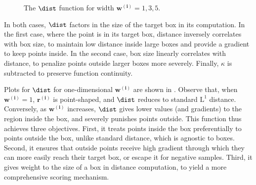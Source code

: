 \documentclass{article}
\begin{document}
\begin{wrapfigure}[16]{r}{0.35\textwidth}
\centering
{}
\caption{The $\dist$ function for width ${\bm{w^{(i)}}=1,3,5}$.}
\label{fig:boxdist}
\end{wrapfigure}

In both cases, $\dist$ factors in the size of the target box in its computation. In the first case, where the point is in its target box, distance inversely correlates with box size, to maintain low distance inside large boxes and provide a gradient to keep points inside. In the second case, box size linearly correlates with distance, to penalize points outside larger boxes more severely. Finally, $\kappa$ is subtracted to preserve function continuity.

Plots for $\dist$ for one-dimensional $\bm{w^{(i)}}$ are shown in . Observe that, when $\bm{w^{(i)}}=1$, $\bm{r^{(i)}}$ is point-shaped, and $\dist$ reduces to standard $\text{L}^1$ distance. Conversely, as $\bm{w^{(i)}}$ increases, $\dist$ gives lower values (and gradients) to the region inside the box, and severely punishes points outside. 
This function thus achieves three objectives. First, it treats points inside the box preferentially to points outside the box, unlike  standard distance, which is agnostic to boxes. Second, it ensures that outside points receive high gradient through which they can more easily reach their target box, or escape it for negative samples. Third, it gives weight to the size of a box in distance computation, to yield a more comprehensive scoring mechanism.
\end{document}
